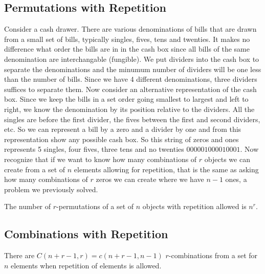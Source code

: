    \subsection {Permutations with Repetition}
Consider a cash drawer. There are various denominations of bills that are drawn from a small set of bills, typically singles, fives, tens and twenties. It makes no difference what order the bills are in in the cash box since all bills of the same denomination are interchangable (fungible). We put dividers into the cash box to separate the denominations and the minumum number of dividers will be one less than the number of bills. Since we have 4 different denominations, three dividers suffices to separate them. Now consider an alternative representation of the cash box. Since we keep the bills in a set order going smallest to largest and left to right, we know the denomination by its position relative to the dividers. All the singles are before the first divider, the fives between the first and second dividers, etc. So we can represent a bill by a zero and a divider by one and from this representation show any possible cash box.  So this string of zeros and ones represents 5 singles, four fives, three tens and no twenties $000001000010001$. Now recognize that if we want to know how many combinations of $r$ objects we can create from a set of $n$ elements allowing for repetition, that is the same as asking how many combinations of $r$ zeros we can create where we have $n-1$ ones, a problem we previously solved.


\begin{theorem}
The number of $r$-permutations of a set of $n$ objects with repetition allowed is $n^r$.
\end{theorem}


    \subsection {Combinations with Repetition}
\begin{theorem} 
There are $C(n+r-1,r) = c(n+r-1,n-1)$  $r$-combinations from a set for $n$ elements when repetition of elements is allowed.
\end{theorem} 



